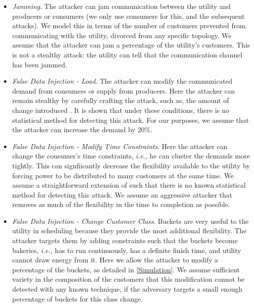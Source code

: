 \documentclass[conference]{IEEEtran}
\newcommand{\ie}{\emph{i.e.,}\xspace}
\begin{document}
\begin{itemize}
\item {\em Jamming}. The attacker can jam communication between the utility and producers or consumers (we only use consumers for this, and the subsequent attacks). We model this in terms of the number of customers prevented from communicating with the utility, divorced from any specific topology. We assume that the attacker can jam a percentage of the utility's customers. This is not a stealthy attack: the utility can tell that the communication channel has been jammed.

\item {\em False Data Injection - Load}. The attacker can modify the communicated demand from consumers or supply from producers. Here the attacker can remain stealthy by carefully crafting the attack, such as, the amount of change introduced \cite{yuan2011modeling}. It is shown that under these conditions, there is no statistical method for detecting this attack. For our purposes, we assume that the attacker can increase the demand by 20\%. 

\item {\em False Data Injection - Modify Time Constraints}. Here the attacker can change the consumer's time constraints, \ie he can cluster the demands more tightly. This can signfiicantly decrease the flexibility available to the utility by forcing power to be distributed to many customers at the same time. We assume a straightforward extension of \cite{yuan2011modeling} such that there is no known statistical method for detecting this attack.  We assume an aggressive attacker that removes as much of the flexibility in the time to completion as possible.

\item {\em False Data Injection - Change Customer Class}. Buckets are very useful to the utility in scheduling because they provide
the most additional flexibility. The attacker targets them by adding constraints such that the buckets become bakeries, \ie has to run continuously, has a definite finish time, and utility cannot draw energy from it.  Here we allow the attacker to modify a percentage of the buckets, as detailed in \ref{Simulation}.  We assume sufficient variety in the composition of the customers that this modification cannot be detected with any known technique, if the adversary targets a small enough percentage of buckets for this class change. 

\end{itemize}
\end{document}
